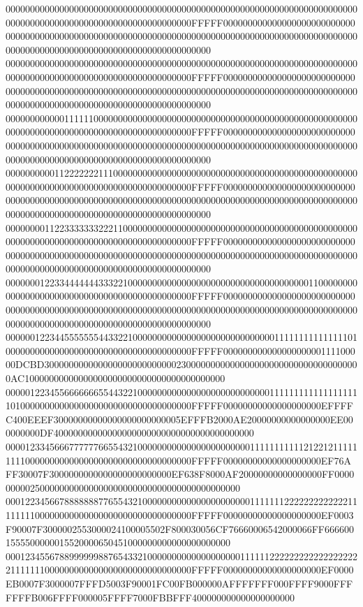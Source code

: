 00000000000000000000000000000000000000000000000000000000000000000000000000000000000000000000000000000000000000FFFFF000000000000000000000000000000000000000000000000000000000000000000000000000000000000000000000000000000000000000000000000000000000000000000000
00000000000000000000000000000000000000000000000000000000000000000000000000000000000000000000000000000000000000FFFFF000000000000000000000000000000000000000000000000000000000000000000000000000000000000000000000000000000000000000000000000000000000000000000000
00000000000011111100000000000000000000000000000000000000000000000000000000000000000000000000000000000000000000FFFFF000000000000000000000000000000000000000000000000000000000000000000000000000000000000000000000000000000000000000000000000000000000000000000000
00000000001122222221110000000000000000000000000000000000000000000000000000000000000000000000000000000000000000FFFFF000000000000000000000000000000000000000000000000000000000000000000000000000000000000000000000000000000000000000000000000000000000000000000000
00000000112233333332221100000000000000000000000000000000000000000000000000000000000000000000000000000000000000FFFFF000000000000000000000000000000000000000000000000000000000000000000000000000000000000000000000000000000000000000000000000000000000000000000000
00000001223344444443332210000000000000000000000000000000000000110000000000000000000000000000000000000000000000FFFFF000000000000000000000000000000000000000000000000000000000000000000000000000000000000000000000000000000000000000000000000000000000000000000000
00000012234455555554433221000000000000000000000000000001111111111111110100000000000000000000000000000000000000FFFFF00000000000000000000111100000DCBD30000000000000000000000000023000000000000000000000000000000000000AC10000000000000000000000000000000000000000
00000122345566666665544322100000000000000000000000000011111111111111111110100000000000000000000000000000000000FFFFF00000000000000000000EFFFFC400EEEF30000000000000000000000005EFFFB2000AE20000000000000000EE000000000DF40000000000000000000000000000000000000000
00001233456667777776655432100000000000000000000000111111111112122121111111110000000000000000000000000000000000FFFFF00000000000000000000EF76AFF30007F3000000000000000000000000EF638F8000AF20000000000000000FF0000000002500000000000000000000000000000000000000000
00012234566788888887765543210000000000000000000000111111122222222222221111111100000000000000000000000000000000FFFFF00000000000000000000EF0003F90007F3000002553000024100005502F800030056CF76660006542000066FF6666001555500000015520000650451000000000000000000000
00012345567889999998876543321000000000000000000011111122222222222222222221111111000000000000000000000000000000FFFFF00000000000000000000EF0000EB0007F3000007FFFD5003F90001FC00FB000000AFFFFFFF000FFFF9000FFFFFFFB006FFFF000005FFFF7000FBBFFF400000000000000000000
